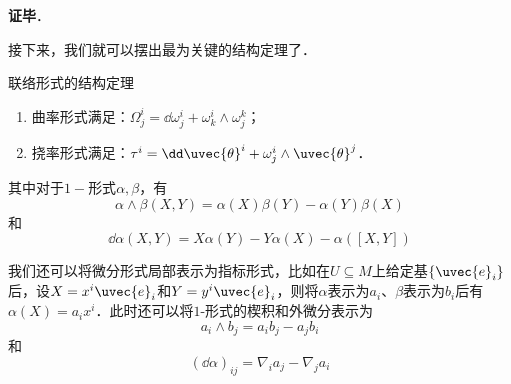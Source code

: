 \textbf{证毕}．

接下来，我们就可以摆出最为关键的结构定理了．

\begin{theorem}{联络形式的结构定理}
\begin{enumerate}
\item 曲率形式满足：$\Omega^i_j=\dd \omega^i_j+\omega^i_k\wedge\omega^k_j$；
\item 挠率形式满足：$\tau^i=\dd\uvec{\theta}^i+\omega^i_j\wedge\uvec{\theta}^j$．
\end{enumerate}

其中对于$1-$形式$\alpha, \beta$，有
\begin{equation}
\alpha\wedge \beta(X, Y)=\alpha(X)\beta(Y)-\alpha(Y)\beta(X)
\end{equation}
和
\begin{equation}
\dd \alpha(X, Y)=X\alpha(Y)-Y\alpha(X)-\alpha([X, Y])
\end{equation}

我们还可以将微分形式局部表示为指标形式，比如在$U\subseteq M$上给定基$\{\uvec{e}_i\}$后，设$X=x^i\uvec{e}_i$和$Y=y^i\uvec{e}_i$，则将$\alpha$表示为$a_i$、$\beta$表示为$b_i$后有$\alpha(X)=a_ix^i$．此时还可以将$1$-形式的楔积和外微分表示为
\begin{equation}
a_i\wedge b_j=a_ib_j-a_jb_i
\end{equation}
和
\begin{equation}
(\dd \alpha)_{ij}=\nabla_{i}a_j-\nabla_{j}a_i
\end{equation}
\end{theorem}


\










